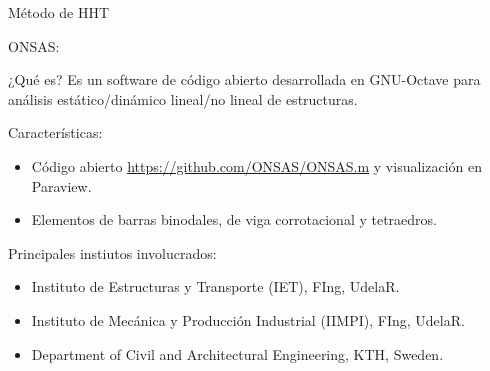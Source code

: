 \documentclass[
  aspectratio=169,
]{beamer}
\begin{document}
\begin{small}
\begin{frame}{Método de HHT}
\end{frame}
\begin{frame}{ONSAS:}{}
	\begin{block}{¿Qué es?}
		Es un software de código abierto desarrollada en GNU-Octave para análisis estático/dinámico lineal/no lineal de estructuras. 
	\end{block}
	\begin{block}{Características:}
		\begin{itemize}
			\item Código abierto {\color{blue}\href{https://github.com/ONSAS/ONSAS.m/}{https://github.com/ONSAS/ONSAS.m}} y visualización en {\color{red} Paraview}.
			\item Elementos de barras binodales, de viga corrotacional y tetraedros.
		\end{itemize}
	\end{block}
	\begin{block}{Principales instiutos involucrados:}
		\begin{itemize}
			\item Instituto de Estructuras y Transporte (IET), FIng, UdelaR.
			\item Instituto de Mecánica y Producción Industrial (IIMPI), FIng, UdelaR.
			\item Department of Civil and Architectural Engineering, KTH, Sweden.
		\end{itemize}
	\end{block}
	

\end{frame}
\end{small}
\end{document}
